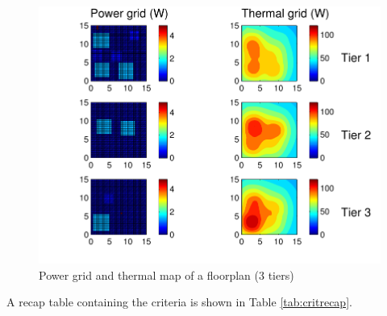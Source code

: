 \begin{enumerate}
\begin{figure}[h!]
\begin{center}
\includegraphics[width=1\linewidth]{heatmapex_gray2.pdf}
\end{center}
\vspace{-0.5cm}
\caption{Power grid and thermal map of a floorplan (3 tiers)}
\label{fig:thermalmap}
\end{figure}

\end{enumerate}

A recap table containing the criteria is shown in Table \ref{tab:critrecap}.

